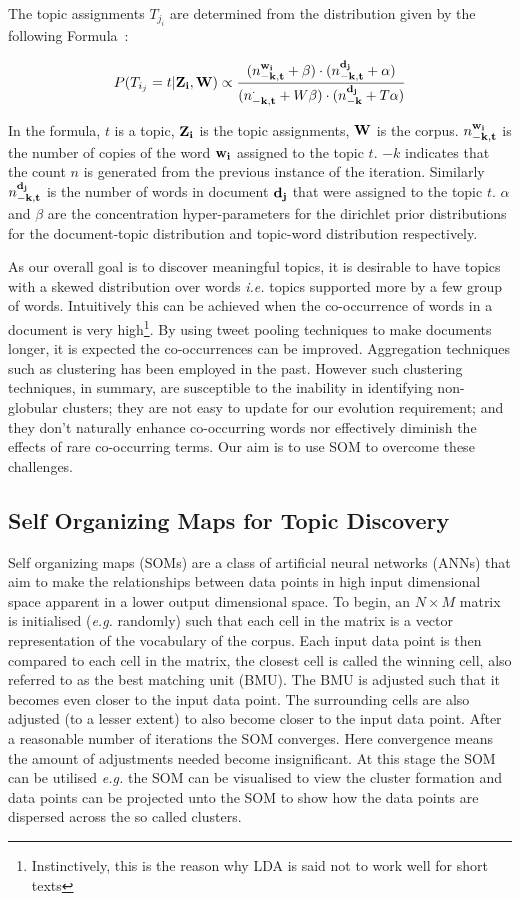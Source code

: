 \documentclass{article}
\begin{document}
The topic assignments $T_{j_i}$ are determined from the distribution given by the following Formula~\cite{Griffiths04}:

\[P(T_{i_j} = t|{\bf Z_i, W}) \propto \frac{(n^{\bf w_i}_{\bf -k,t}+\beta) \cdot (n^{\bf d_j}_{\bf -k,t}+\alpha )}{(n^{\cdot}_{\bf -k,t}+W\beta ) \cdot (n^{\bf d_j}_{\bf -k}+T\alpha)} \]  

In the formula, $t$ is a topic, $\bf Z_i$ is the topic assignments, $\bf W$ is the corpus. $n^{\bf w_i}_{\bf -k,t}$ is the number of copies of the word $\bf w_i$ assigned to the topic $t$. $-k$ indicates that the count $n$ is generated from the previous instance of the iteration. Similarly $n^{\bf d_j}_{\bf -k,t}$ is the number of words in document $\bf d_j$ that were assigned to the topic $t$. $\alpha$ and $\beta$ are the concentration hyper-parameters for the dirichlet prior distributions for the document-topic distribution  and topic-word distribution respectively.

As our overall goal is to discover meaningful topics, it is desirable to have topics with a skewed distribution over words \emph{i.e.} topics supported more by a few group of words. Intuitively this can be achieved when the co-occurrence of words in a document is very high\footnote{Instinctively, this is the reason why LDA is said not to work well for short texts}. By using tweet pooling techniques to make documents longer, it is expected the co-occurrences can be improved. Aggregation techniques such as clustering has been employed in the past. However such clustering techniques, in summary, are susceptible to the inability in  identifying non-globular clusters; they are not easy to update for our evolution requirement; and they don't naturally enhance co-occurring words nor effectively diminish the effects of rare co-occurring terms. Our aim is to use SOM to overcome these challenges.


\subsection{Self Organizing Maps for Topic Discovery}
Self organizing maps (SOMs) are a class of artificial neural networks (ANNs) that aim to make the relationships between data points in high input dimensional space apparent in a lower output dimensional space. To begin, an $N\times M$ matrix is initialised (\emph{e.g.} randomly) such that each cell in the matrix is a vector representation of the vocabulary of the corpus.  Each input data point is then compared to each cell in the matrix, the closest cell is called the winning cell, also referred to as the best matching unit (BMU). The BMU is adjusted such that it becomes even closer to the input data point. The surrounding cells are also adjusted (to a lesser extent) to also  become closer to the input data point. After a reasonable number of iterations the SOM converges. Here convergence means the amount of adjustments needed become insignificant. At this stage the SOM can be utilised \emph{e.g.} the SOM can be visualised to view the cluster formation and data points can be projected unto the SOM to show how the data points are dispersed across the so called clusters. 
\end{document}

